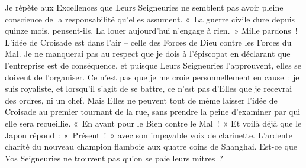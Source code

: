 \documentclass[french,twoside]{book} %
\newcommand{\astertri}{\medskip\par\centerline{\color{rubric}\large\selectfont{\syms ✻\,✻\,✻}}\medskip\par}%
\begin{document}
Je répète aux Excellences que Leurs Seigneuries ne semblent pas avoir pleine conscience de la responsabilité qu’elles assument. « La guerre civile dure depuis quinze mois, pensent-ils. La louer aujourd’hui n’engage à rien. » Mille pardons ! L’idée de Croisade est dans l’air – celle des Forces de Dieu contre les Forces du Mal. Je ne manquerai pas au respect que je dois à l’épiscopat en déclarant que l’entreprise est de conséquence, et puisque Leurs Seigneuries l’approuvent, elles se doivent de l’organiser. Ce n’est pas que je me croie personnellement en cause : je suis royaliste, et lorsqu’il s’agit de se battre, ce n’est pas d’Elles que je recevrai des ordres, ni un chef. Mais Elles ne peuvent tout de même laisser l’idée de Croisade au premier tournant de la rue, sans prendre la peine d’examiner par qui elle sera recueillie. « En avant pour le Bien contre le Mal ! » Et voilà déjà que le Japon répond : « Présent ! » avec son impayable voix de clarinette. L’ardente charité du nouveau champion flamboie aux quatre coins de Shanghai. Est-ce que Vos Seigneuries ne trouvent pas qu’on se paie leurs mitres ?\par
 \par

\astertri
\end{document}

